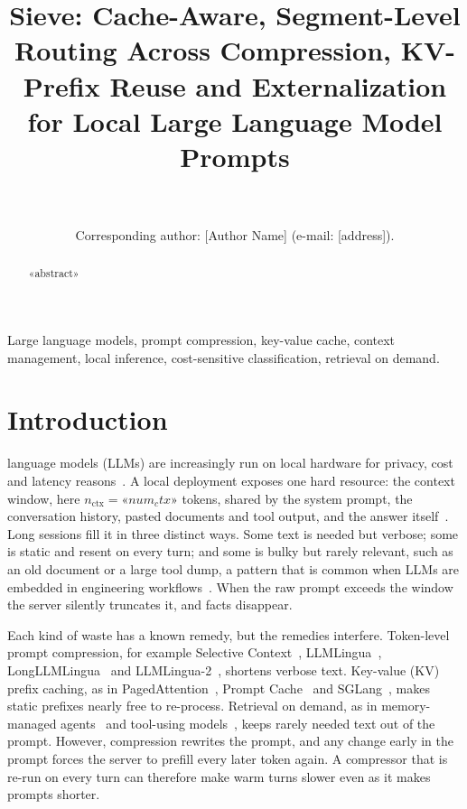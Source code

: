 \documentclass[journal]{IEEEtran}
\begin{document}
\title{Sieve: Cache-Aware, Segment-Level Routing Across Compression, KV-Prefix Reuse and Externalization for Local Large Language Model Prompts}
\author{\\
\\
Corresponding author: [Author Name] (e-mail: [address]).}
\maketitle
\pagestyle{accesshead}\thispagestyle{accesshead}

\begin{abstract}
«abstract»
\end{abstract}

\begin{IEEEkeywords}
Large language models, prompt compression, key-value cache, context management, local inference, cost-sensitive classification, retrieval on demand.
\end{IEEEkeywords}

\section{Introduction}
 language models (LLMs) are increasingly run on local hardware for privacy, cost and latency
reasons~\cite{qu2025edge,schwartz2020green}. A local deployment exposes one hard resource: the context window, here
$n_\text{ctx}=«num_ctx»$ tokens, shared by the system prompt, the conversation history, pasted documents and tool output, and the
answer itself~\cite{naveed2025overview,raiaan2024review}. Long sessions fill it in three distinct ways. Some text is needed but
verbose; some is static and resent on every turn; and some is bulky but rarely relevant, such as an old document or a large tool
dump, a pattern that is common when LLMs are embedded in engineering workflows~\cite{hou2024llm4se}. When the raw prompt exceeds
the window the server silently truncates it, and facts disappear.

Each kind of waste has a known remedy, but the remedies interfere. Token-level prompt compression, for example
Selective Context~\cite{li2023selective}, LLMLingua~\cite{jiang2023llmlingua}, LongLLMLingua~\cite{jiang2024longllmlingua} and
LLMLingua-2~\cite{pan2024llmlingua2}, shortens verbose text. Key-value (KV) prefix caching, as in
PagedAttention~\cite{kwon2023vllm}, Prompt Cache~\cite{gim2024promptcache} and SGLang~\cite{zheng2024sglang}, makes static
prefixes nearly free to re-process. Retrieval on demand, as in memory-managed agents~\cite{packer2023memgpt,zhang2025memory} and
tool-using models~\cite{schick2023toolformer,qin2024tool}, keeps rarely needed text out of the prompt. However, compression
rewrites the prompt, and any change early in the prompt forces the server to prefill every later token again. A compressor that
is re-run on every turn can therefore make warm turns slower even as it makes prompts shorter.
\end{document}
